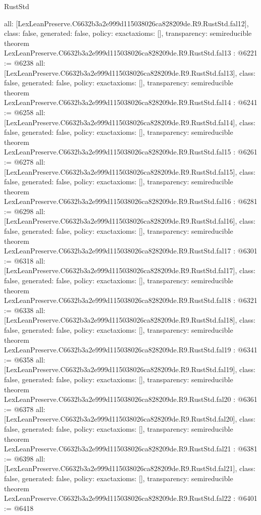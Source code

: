 \begin{lexlean}{RustStd}
\begin{coremodule}
{  all: [LexLeanPreserve.C6632b3a2e999d115038026ca828209de.R9.RustStd.fal12],
  class: false,
  generated: false,
  policy: exact{axioms: []},
  transparency: semireducible
}
theorem LexLeanPreserve.C6632b3a2e999d115038026ca828209de.R9.RustStd.fal13 : @6221 := @6238 {
  all: [LexLeanPreserve.C6632b3a2e999d115038026ca828209de.R9.RustStd.fal13],
  class: false,
  generated: false,
  policy: exact{axioms: []},
  transparency: semireducible
}
theorem LexLeanPreserve.C6632b3a2e999d115038026ca828209de.R9.RustStd.fal14 : @6241 := @6258 {
  all: [LexLeanPreserve.C6632b3a2e999d115038026ca828209de.R9.RustStd.fal14],
  class: false,
  generated: false,
  policy: exact{axioms: []},
  transparency: semireducible
}
theorem LexLeanPreserve.C6632b3a2e999d115038026ca828209de.R9.RustStd.fal15 : @6261 := @6278 {
  all: [LexLeanPreserve.C6632b3a2e999d115038026ca828209de.R9.RustStd.fal15],
  class: false,
  generated: false,
  policy: exact{axioms: []},
  transparency: semireducible
}
theorem LexLeanPreserve.C6632b3a2e999d115038026ca828209de.R9.RustStd.fal16 : @6281 := @6298 {
  all: [LexLeanPreserve.C6632b3a2e999d115038026ca828209de.R9.RustStd.fal16],
  class: false,
  generated: false,
  policy: exact{axioms: []},
  transparency: semireducible
}
theorem LexLeanPreserve.C6632b3a2e999d115038026ca828209de.R9.RustStd.fal17 : @6301 := @6318 {
  all: [LexLeanPreserve.C6632b3a2e999d115038026ca828209de.R9.RustStd.fal17],
  class: false,
  generated: false,
  policy: exact{axioms: []},
  transparency: semireducible
}
theorem LexLeanPreserve.C6632b3a2e999d115038026ca828209de.R9.RustStd.fal18 : @6321 := @6338 {
  all: [LexLeanPreserve.C6632b3a2e999d115038026ca828209de.R9.RustStd.fal18],
  class: false,
  generated: false,
  policy: exact{axioms: []},
  transparency: semireducible
}
theorem LexLeanPreserve.C6632b3a2e999d115038026ca828209de.R9.RustStd.fal19 : @6341 := @6358 {
  all: [LexLeanPreserve.C6632b3a2e999d115038026ca828209de.R9.RustStd.fal19],
  class: false,
  generated: false,
  policy: exact{axioms: []},
  transparency: semireducible
}
theorem LexLeanPreserve.C6632b3a2e999d115038026ca828209de.R9.RustStd.fal20 : @6361 := @6378 {
  all: [LexLeanPreserve.C6632b3a2e999d115038026ca828209de.R9.RustStd.fal20],
  class: false,
  generated: false,
  policy: exact{axioms: []},
  transparency: semireducible
}
theorem LexLeanPreserve.C6632b3a2e999d115038026ca828209de.R9.RustStd.fal21 : @6381 := @6398 {
  all: [LexLeanPreserve.C6632b3a2e999d115038026ca828209de.R9.RustStd.fal21],
  class: false,
  generated: false,
  policy: exact{axioms: []},
  transparency: semireducible
}
theorem LexLeanPreserve.C6632b3a2e999d115038026ca828209de.R9.RustStd.fal22 : @6401 := @6418 {
}
\end{coremodule}
\end{lexlean}
